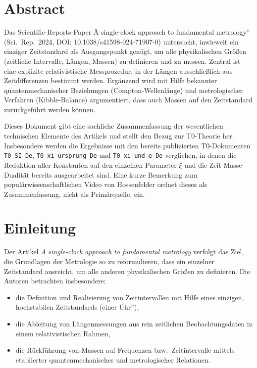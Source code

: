 \section*{Abstract}
Das Scientific-Reports-Paper Ä single-clock approach to fundamental metrology''
(Sci.\ Rep.\ 2024, DOI: 10.1038/s41598-024-71907-0) untersucht, inwieweit ein
einziger Zeitstandard als Ausgangspunkt genügt, um alle physikalischen Größen
(zeitliche Intervalle, Längen, Massen) zu definieren und zu messen. Zentral ist
eine explizite relativistische Messprozedur, in der Längen ausschließlich aus
Zeitdifferenzen bestimmt werden. Ergänzend wird mit Hilfe bekannter
quantenmechanischer Beziehungen (Compton-Wellenlänge) und metrologischer
Verfahren (Kibble-Balance) argumentiert, dass auch Massen auf den Zeitstandard
zurückgeführt werden können.

Dieses Dokument gibt eine sachliche Zusammenfassung der wesentlichen technischen
Elemente des Artikels und stellt den Bezug zur T0-Theorie her. Insbesondere
werden die Ergebnisse mit den bereits publizierten T0-Dokumenten
\texttt{T0\_SI\_De}, \texttt{T0\_xi\_ursprung\_De} und \texttt{T0\_xi-und-e\_De}
verglichen, in denen die Reduktion aller Konstanten auf den einzelnen Parameter
$\xi$ und die Zeit-Masse-Dualität bereits ausgearbeitet sind. Eine kurze
Bemerkung zum populärwissenschaftlichen Video von Hossenfelder ordnet dieses als
Zusammenfassung, nicht als Primärquelle, ein.



\section{Einleitung}

Der Artikel \emph{A single-clock approach to fundamental metrology}
\cite{terrell_single_clock_nature_2024} verfolgt das Ziel, die Grundlagen der
Metrologie so zu reformulieren, dass ein einzelner Zeitstandard ausreicht, um
alle anderen physikalischen Größen zu definieren. Die Autoren betrachten
insbesondere:
\begin{itemize}
  \item die Definition und Realisierung von Zeitintervallen mit Hilfe eines
        einzigen, hochstabilen Zeitstandards (einer Ühr''),
  \item die Ableitung von Längenmessungen aus rein zeitlichen
        Beobachtungsdaten in einem relativistischen Rahmen,
  \item die Rückführung von Massen auf Frequenzen bzw.\ Zeitintervalle mittels
        etablierter quantenmechanischer und metrologischer Relationen.
\end{itemize}

